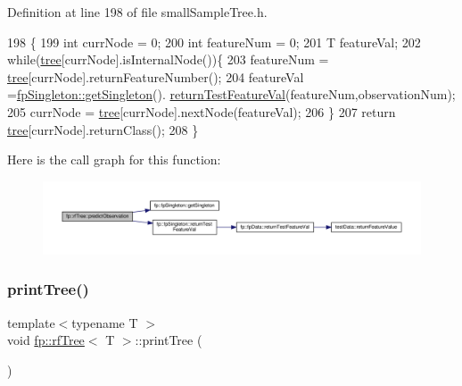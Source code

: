 Definition at line 198 of file small\+Sample\+Tree.\+h.


\begin{DoxyCode}
198                                                           \{
199                     \textcolor{keywordtype}{int} currNode = 0;
200                     \textcolor{keywordtype}{int} featureNum = 0;
201                     T featureVal;
202                     \textcolor{keywordflow}{while}(\hyperlink{classtree}{tree}[currNode].isInternalNode())\{
203                         featureNum = \hyperlink{classtree}{tree}[currNode].returnFeatureNumber();
204                         featureVal =\hyperlink{classfp_1_1fpSingleton_a8bdae77b68521003e3fc630edec2e240}{fpSingleton::getSingleton}().
      \hyperlink{classfp_1_1fpSingleton_ad74b421d65b17ba924244bff31fc9db6}{returnTestFeatureVal}(featureNum,observationNum);
205                         currNode = \hyperlink{classtree}{tree}[currNode].nextNode(featureVal);
206                     \}
207                     \textcolor{keywordflow}{return} \hyperlink{classtree}{tree}[currNode].returnClass();
208                 \}
\end{DoxyCode}
Here is the call graph for this function\+:
\nopagebreak
\begin{figure}[H]
\begin{center}
\leavevmode
\includegraphics[width=350pt]{classfp_1_1rfTree_aad66c44e2062c163b1560f9bf1bd759f_cgraph}
\end{center}
\end{figure}
\mbox{\label{classfp_1_1rfTree_a89d982d5df6e068079d2fff5f6c15f58}} 
\subsubsection{\texorpdfstring{print\+Tree()}{printTree()}\hspace{0.1cm}{\footnotesize\ttfamily [1/2]}}
{\footnotesize\ttfamily template$<$typename T $>$ \\
void \hyperlink{classfp_1_1rfTree}{fp\+::rf\+Tree}$<$ T $>$\+::print\+Tree (\begin{DoxyParamCaption}{ }\end{DoxyParamCaption})\hspace{0.3cm}{\ttfamily [inline]}}



